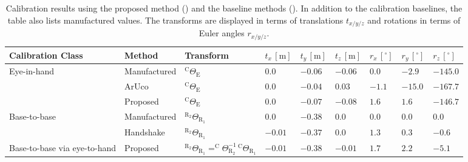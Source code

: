 \begin{landscape}
\begin{table}[]
\caption{Calibration results using the proposed method () and the baseline methods (). In addition to the calibration baselines, the table also lists manufactured values. The transforms are displayed in terms of translations $t_{x/y/z}$ and rotations in terms of Euler angles $r_{x/y/z}$.}
\label{c1:tab:calibration_results}
\centering
\begin{tabular}{|l|l|l|l|l|l|l|l|l|}
\hline
Calibration Class             & Method       & Transform                                                                                                        & $t_x\,[\text{m}]$ & $t_y\,[\text{m}]$ & $t_z\,[\text{m}]$ & $r_x\,[^\circ]$ & $r_y\,[^\circ]$ & $r_z\,[^\circ]$ \\ \hline
\multirow{3}{*}{Eye-in-hand}  & Manufactured & $^\text{C}\Theta_\text{E}$                                                                                  & $ 0.0$            & $-0.06$           & $-0.06$           & $ 0.0$          & $-2.9$          & $-145.0$        \\ \cline{2-9} 
                              & ArUco        & $^\text{C}\Theta_\text{E}$                                                                                  & $ 0.0$            & $-0.04$           & $ 0.03$           & $-1.1$          & $-15.0$         & $-167.7$        \\ \cline{2-9} 
                              & Proposed     & $^\text{C}\Theta_\text{E}$                                                                                  & $ 0.0$            & $-0.07$           & $-0.08$           & $ 1.6$          & $ 1.6$          & $-146.7$        \\ \hline
\multirow{2}{*}{Base-to-base} & Manufactured & $^{\text{R}_2}\Theta_{\text{R}_1}$                                                                           & $ 0.0$            & $-0.38$           & $ 0.0$            & $0.0$           & $0.0$           & $ 0.0$          \\ \cline{2-9}
                              & Handshake    & $^{\text{R}_2}\Theta_{\text{R}_1}$                                                                           & $-0.01$           & $-0.37$           & $ 0.0$            & $1.3$           & $0.3$           & $-0.6$          \\ \hline
Base-to-base via eye-to-hand  & Proposed     & $^{\text{R}_2}\Theta_{\text{R}_1} = ^\text{C}\Theta^{-1}_{\text{R}_2}\,^\text{C}\Theta_{\text{R}_1}$ & $-0.01$           & $-0.38$           & $-0.01$           & $1.7$           & $2.2$           & $-5.1$          \\ \hline
\end{tabular}
\end{table}
\end{landscape}

